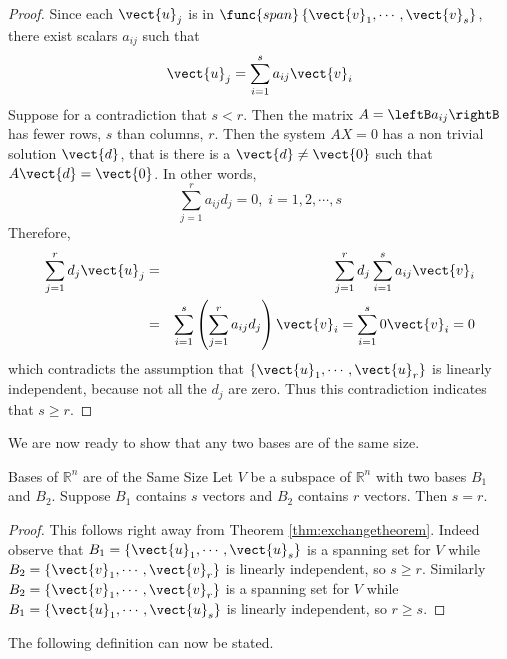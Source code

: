 \begin{proof}
Since each $\vect{u}_j$ is in $\func{span}\left\{ \vect{v}_{1},\cdots ,\vect{v}_{s}\right\} 
$, there exist scalars $a_{ij}$ such that 
\begin{equation*}
\vect{u}_{j}=\sum_{i=1}^{s}a_{ij}\vect{v}_{i}
\end{equation*}
Suppose for a contradiction that $s<r$. Then the matrix $A = \leftB
a_{ij} \rightB$ has fewer rows, $s$ than columns, $r$. Then the system
$AX=0$ has %
a non trivial solution $\vect{d}$, that is there is a  $\vect{d}\neq \vect{0}$ such that  $A\vect{d}=\vect{0}$. In other
words, 
\begin{equation*}
\sum_{j=1}^{r}a_{ij}d_{j}=0,\;i=1,2,\cdots ,s
\end{equation*}
Therefore, 
\begin{eqnarray*}
\sum_{j=1}^{r}d_{j}\vect{u}_{j} &=&\sum_{j=1}^{r}d_{j}\sum_{i=1}^{s}a_{ij}
\vect{v}_{i} \\
&=&\sum_{i=1}^{s}\left( \sum_{j=1}^{r}a_{ij}d_{j}\right) \vect{v}
_{i}=\sum_{i=1}^{s}0\vect{v}_{i}=0
\end{eqnarray*}
which contradicts the assumption that $\left\{ \vect{u}_{1},\cdots ,\vect{u}_{r}\right\} $
is linearly independent, because not all the $d_{j}$ are zero. Thus this contradiction indicates that $s\geq r$. 
\end{proof}

We are now ready to show that any two bases are of the same size. 

\begin{theorem}{Bases of $\mathbb{R}^{n}$ are of the Same Size}\label{thm:basessamesize}
Let $V$ be a subspace of $\mathbb{R}^{n}$ with two bases $B_1$ and $B_2$. Suppose $B_1$ contains $s$ vectors and $B_2$ contains $r$ vectors. Then $s=r.$
\end{theorem}

\begin{proof}
This follows right away from Theorem \ref{thm:exchangetheorem}. Indeed
observe that $B_1 = \left\{
\vect{u}_{1},\cdots ,\vect{u}_{s}\right\} $ is a spanning set for $V$ while $
B_2 = \left\{ \vect{v}_{1},\cdots ,\vect{v}_{r}\right\} $ is linearly
independent, so $s \geq r.$ Similarly $B_2 = \left\{ \vect{v}_{1},\cdots ,\vect{v}
_{r}\right\} $ is a spanning set for $V$ while $B_1 = \left\{ \vect{u}_{1},\cdots ,
\vect{u}_{s}\right\} $ is linearly independent,  so $r\geq s$.
\end{proof}

The following definition can now be stated.

